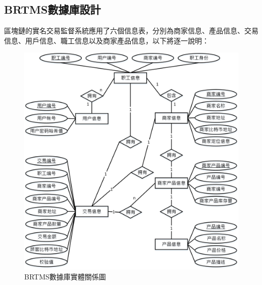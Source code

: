 	\subsection{BRTMS數據庫設計}

	區塊鏈的實名交易監督系統應用了六個信息表，分別為商家信息、產品信息、交易信息、用戶信息、職工信息以及商家產品信息，以下將逐一說明：

		\begin{figure}[!htbp]
			\centering
			\includegraphics[width = 1\textwidth]{er.jpg}
			\caption{BRTMS數據庫實體關係圖}\label{db}
		\end{figure}

